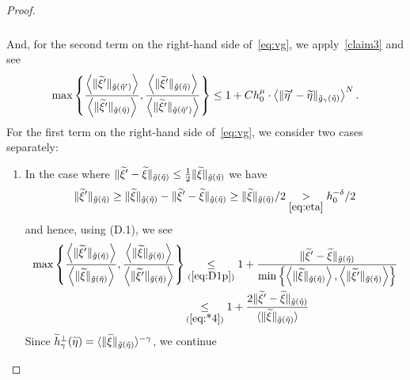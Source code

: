 \documentclass[10pt]{amsart}
\theoremstyle{definition}\newtheorem{defi}[theo]{Definition}\newtheorem{rema}[theo]{Remark}\newtheorem{exam}[theo]{Example}\newtheorem{exem}[theo]{Example}\newtheorem{nota}[theo]{Notation}
\newcommand*\ineq[1]{\underset{(#1)}{\leq}}
\let\oldtilde\tilde
\renewcommand*{\tilde}[1]{\mathchoice{\widetilde{#1}}{\widetilde{#1}}{\oldtilde{#1}}{\oldtilde{#1}}}
\begin{document}
\begin{proof}
\begin{multline}
\begin{aligned}
\end{aligned}
\end{multline}
And, for the second term on the right-hand side of~\eqref{eq:vg}, we apply~\eqref{claim3} and see
\begin{equation}\label{hgamma1}
\max\left\{ \frac{\left\langle\|\tilde{\xi}'\|_{\tilde{g}\left(\tilde{\eta}'\right)}\right\rangle}{\left\langle\|\tilde{\xi}'\|_{\tilde{g}\left(\tilde{\eta}\right)}\right\rangle},\frac{\left\langle\|\tilde{\xi}'\|_{\tilde{g}\left(\tilde{\eta}\right)}\right\rangle}{\left\langle\|\tilde{\xi}'\|_{\tilde{g}\left(\tilde{\eta}'\right)}\right\rangle}\right\} \le1+Ch_{0}^{\mu}\cdot\left\langle \|\tilde{\eta}'-\tilde{\eta}\|_{\tilde{g}_{\gamma}\left(\tilde{\eta}\right)}\right\rangle ^{N}.
\end{equation}
For the first term on the right-hand side of~\eqref{eq:vg}, we consider two cases separately:
\begin{enumerate}
\item In the case where $\|\tilde{\xi}'-\tilde{\xi}\|_{\tilde{g}(\tilde{\eta})}\leq\frac{1}{2}\|\tilde{\xi}\|_{\tilde{g}(\tilde{\eta})}$ we have
\begin{equation}
\|\tilde{\xi}'\|_{\tilde{g}\left(\tilde{\eta}\right)}\ge\|\tilde{\xi}\|_{\tilde{g}\left(\tilde{\eta}\right)}-\|\tilde{\xi}'-\tilde{\xi}\|_{\tilde{g}\left(\tilde{\eta}\right)}\ge\|\tilde{\xi}\|_{\tilde{g}\left(\tilde{\eta}\right)}/2\underset{\eqref{eq:eta}}{>}h_{0}^{-\delta}/2\label{eq:*4}
\end{equation}
and hence, using (D.1), we see
\begin{align}
\max\left\{ \frac{\left\langle\|\tilde{\xi}'\|_{\tilde{g}\left(\tilde{\eta}\right)}\right\rangle}{\left\langle\|\tilde{\xi}\|_{\tilde{g}\left(\tilde{\eta}\right)}\right\rangle},\frac{\left\langle\|\tilde{\xi}\|_{\tilde{g}\left(\tilde{\eta}\right)}\right\rangle}{\left\langle\|\tilde{\xi}'\|_{\tilde{g}\left(\tilde{\eta}\right)}\right\rangle}\right\} & \ineq{\ref{eq:D1p}}1+\frac{\|\tilde{\xi}'-\tilde{\xi}\|_{\tilde{g}\left(\tilde{\eta}\right)}}{\min\left\{\left\langle\|\tilde{\xi}\|_{\tilde{g}\left(\tilde{\eta}\right)}\right\rangle,\left\langle\|\tilde{\xi}'\|_{\tilde{g}\left(\tilde{\eta}\right)}\right\rangle\right\}}\label{eq:log}
\\
& \!\ineq{\ref{eq:*4}}1+\frac{2\|\tilde{\xi}'-\tilde{\xi}\|_{\tilde{g}\left(\tilde{\eta}\right)}}{\langle\|\tilde{\xi}\|_{\tilde{g}\left(\tilde{\eta}\right)}\rangle}\label{eq:*10}
\end{align}
Since $\tilde{h}_{\gamma}^{\perp}(\tilde{\eta})=\langle\|\tilde{\xi}\|_{\tilde{g}(\tilde{\eta})}\rangle^{-\gamma}$, we continue

\end{enumerate}
\end{proof}
\end{document}
